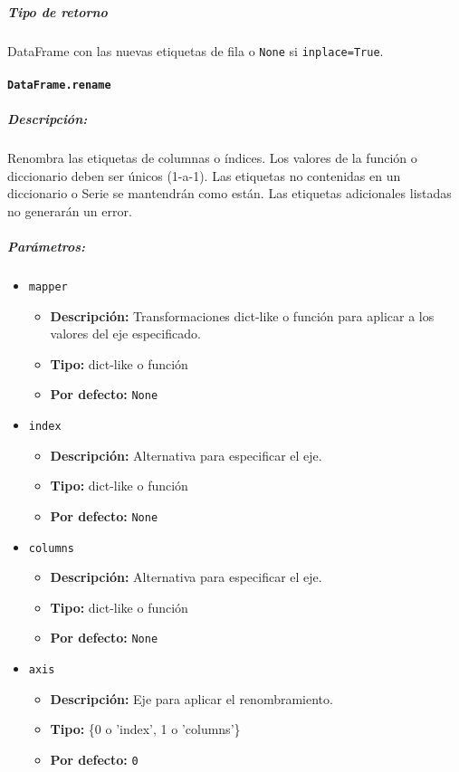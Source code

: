\subparagraph{Tipo de retorno}
DataFrame con las nuevas etiquetas de fila o \texttt{None} si
\texttt{inplace=True}.

\paragraph{\texttt{DataFrame.rename}}

\subparagraph{Descripción:}
Renombra las etiquetas de columnas o índices. Los valores de la función o
diccionario deben ser únicos (1-a-1). Las etiquetas no contenidas en un
diccionario o Serie se mantendrán como están. Las etiquetas adicionales
listadas no generarán un error.

\subparagraph{Parámetros:}
\begin{itemize}
    \item \texttt{mapper}
          \begin{itemize}
              \item \textbf{Descripción:} Transformaciones dict-like o función
                    para aplicar a los valores del eje especificado.
              \item \textbf{Tipo:} dict-like o función
              \item \textbf{Por defecto:} \texttt{None}
          \end{itemize}

    \item \texttt{index}
          \begin{itemize}
              \item \textbf{Descripción:} Alternativa para especificar el eje.
              \item \textbf{Tipo:} dict-like o función
              \item \textbf{Por defecto:} \texttt{None}
          \end{itemize}

    \item \texttt{columns}
          \begin{itemize}
              \item \textbf{Descripción:} Alternativa para especificar el eje.
              \item \textbf{Tipo:} dict-like o función
              \item \textbf{Por defecto:} \texttt{None}
          \end{itemize}

    \item \texttt{axis}
          \begin{itemize}
              \item \textbf{Descripción:} Eje para aplicar el renombramiento.
              \item \textbf{Tipo:} \{0 o 'index', 1 o 'columns'\}
              \item \textbf{Por defecto:} \texttt{0}
          \end{itemize}


\end{itemize}
